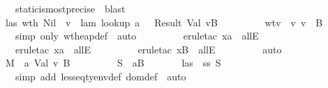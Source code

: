 \begin{isabellebody}
\ \ \ \ \ \ \ \ \isamarkupfalse \ static{\isacharunderscore}is{\isacharunderscore}most{\isacharunderscore}precise\ \isamarkupfalse \ blast\ \isamarkupfalse \isanewline
\ \ \ \ \ \ \isamarkupfalse \ las\ wt{\isacharunderscore}h\ Nil\ \isamarkupfalse \ v\ \ lam{\isacharcolon}\ {\isachardoublequoteopen}lookup\ a\ {\isasymmu}\ {\isacharequal}\ Result\ {\isacharparenleft}Val\ v{\isacharcomma}B{\isacharprime}{\isacharparenright}{\isachardoublequoteclose}\isanewline
\ \ \ \ \ \ \ \ \ wtv{\isacharcolon}\ {\isachardoublequoteopen}{\isasymSigma}\ {\isasymturnstile}v\ v\ {\isacharcolon}\ B{\isacharprime}{\isachardoublequoteclose}\isanewline
\ \ \ \ \ \ \ \ \isamarkupfalse \ {\isacharparenleft}simp\ only{\isacharcolon}\ wt{\isacharunderscore}heap{\isacharunderscore}def{\isacharparenright}\ \isamarkupfalse \ auto\isanewline
\ \ \ \ \ \ \ \ \isamarkupfalse \ {\isacharparenleft}erule{\isacharunderscore}tac\ x{\isacharequal}a\ \ allE{\isacharparenright}\isanewline
\ \ \ \ \ \ \ \ \isamarkupfalse \ {\isacharparenleft}erule{\isacharunderscore}tac\ x{\isacharequal}a\ \ allE{\isacharparenright}\isanewline
\ \ \ \ \ \ \ \ \isamarkupfalse \ {\isacharparenleft}erule{\isacharunderscore}tac\ x{\isacharequal}B{\isacharprime}\ \ allE{\isacharparenright}\isanewline
\ \ \ \ \ \ \ \ \isamarkupfalse \ auto\ \isamarkupfalse \isanewline
\ \ \ \ \ \ \isamarkupfalse \ {\isacharquery}M{}\ {\isacharequal}\ {\isachardoublequoteopen}{\isacharparenleft}a{\isacharcomma}\ {\isacharparenleft}Val\ v{}{\isacharcomma}\ B{\isacharprime}{\isacharparenright}{\isacharparenright}\ {\isacharhash}\ {\isasymmu}{\isachardoublequoteclose}\isanewline
\ \ \ \ \ \ \isamarkupfalse \ {\isacharquery}S{}\ {\isacharequal}\ {\isachardoublequoteopen}{\isacharparenleft}a{\isacharcomma}B{\isacharprime}{\isacharparenright}{\isacharhash}{\isasymSigma}{\isachardoublequoteclose}\isanewline
\ \ \ \ \ \ \isamarkupfalse \ las\ \isamarkupfalse \ ss{\isacharcolon}\ {\isachardoublequoteopen}{\isacharquery}S{}\ {\isasymsqsubseteq}\ {\isasymSigma}{\isachardoublequoteclose}\ \isanewline
\ \ \ \ \ \ \ \ \isamarkupfalse \ {\isacharparenleft}simp\ add{\isacharcolon}\ lesseq{\isacharunderscore}tyenv{\isacharunderscore}def\ dom{\isacharunderscore}def{\isacharparenright}\ \isamarkupfalse \ auto\isanewline

\end{isabellebody}
